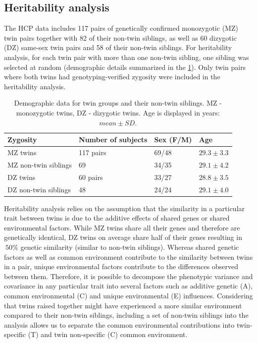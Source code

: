 \subsection{Heritability analysis}
\label{sec:Heritability}

The HCP data includes 117 pairs of genetically confirmed monozygotic (MZ) twin pairs together with 82 of their non-twin siblings, as well as 60 dizygotic (DZ) same-sex twin pairs and 58 of their non-twin siblings. For heritability analysis, for each twin pair with more than one non-twin sibling, one sibling was selected at random (demographic details summarized in the \ref{Ch5Table1}). Only twin pairs where both twins had genotyping-verified zygosity were included in the heritability analysis.

\begin{table}[h!]
\centering
\caption{Demographic data for twin groups and their non-twin siblings. MZ - monozygotic twins, DZ - dizygotic twins. Age is displayed in years: $mean \pm SD$.}
\label{Ch5Table1}
\begin{tabular}{@{}llll@{}}
\toprule
\textbf{Zygosity} & \textbf{Number of subjects} & \textbf{Sex (F/M)} & \textbf{Age} \\ \midrule
MZ twins & 117 pairs & 69/48 & $29.3 \pm 3.3$ \\
MZ non-twin siblings & 69 & 34/35 & $29.1 \pm 4.2$ \\
DZ twins & 60 pairs & 33/27 & $28.8 \pm 3.5$ \\
DZ non-twin siblings & 48 & 24/24 & $29.1 \pm 4.0$ \\ \bottomrule
\end{tabular}
\end{table}

Heritability analysis relies on the assumption that the similarity in a particular trait between twins is due to the additive effects of shared genes or shared environmental factors. While MZ twins share all their genes and therefore are genetically identical, DZ twins on average share half of their genes resulting in $~50\%$ genetic similarity (similar to non-twin siblings). Whereas shared genetic factors as well as common environment contribute to the similarity between twins in a pair, unique environmental factors contribute to the differences observed between them. Therefore, it is possible to decompose the phenotypic variance and covariance in any particular trait into several factors such as additive genetic (A), common environmental (C) and unique environmental (E) influences. Considering that twins raised together might have experienced a more similar environment compared to their non-twin siblings, including a set of non-twin siblings into the analysis allows us to separate the common environmental contributions into twin-specific (T) and twin non-specific (C) common environment.

